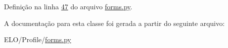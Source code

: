 Definição na linha \hyperlink{Profile_2forms_8py_source_l00047}{47} do arquivo \hyperlink{Profile_2forms_8py_source}{forms.\-py}.



A documentação para esta classe foi gerada a partir do seguinte arquivo\-:\begin{DoxyCompactItemize}
\item 
E\-L\-O/\-Profile/\hyperlink{Profile_2forms_8py}{forms.\-py}\end{DoxyCompactItemize}
